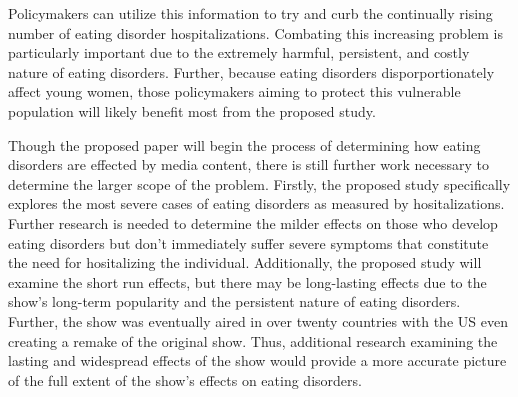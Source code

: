 \documentclass[12pt]{article}
\begin{document}
Policymakers can utilize this information to try and curb the continually rising number of eating disorder hospitalizations. Combating this increasing problem is particularly important due to the extremely harmful, persistent, and costly nature of eating disorders. Further, because eating disorders disporportionately affect young women, those policymakers aiming to protect this vulnerable population will likely benefit most from the proposed study.

Though the proposed paper will begin the process of determining how eating disorders are effected by media content, there is still further work necessary to determine the larger scope of the problem. Firstly, the proposed study specifically explores the most severe cases of eating disorders as measured by hositalizations. Further research is needed to determine the milder effects on those who develop eating disorders but don't immediately suffer severe symptoms that constitute the need for hositalizing the individual. Additionally, the proposed study will examine the short run effects, but there may be long-lasting effects due to the show's long-term popularity and the persistent nature of eating disorders. Further, the show was eventually aired in over twenty countries with the US even creating a remake of the original show. Thus, additional research examining the lasting and widespread effects of the show would provide a more accurate picture of the full extent of the show's effects on eating disorders.

\pagebreak
\end{document}
